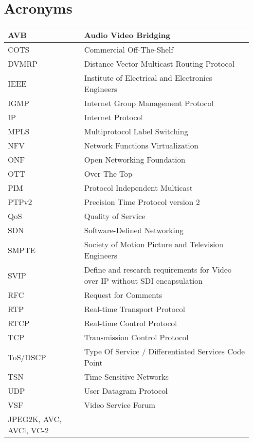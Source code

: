 \cleardoublepage
{}
\chapter*{Acronyms}

\begin{table*}[htb]
\centering
\begin{tabular}{p{} p{}}
\hline
AVB & Audio Video Bridging \\
\hline
COTS & Commercial Off-The-Shelf \\
\hline
DVMRP & Distance Vector Multicast Routing Protocol \\
\hline
IEEE & Institute of Electrical and Electronics Engineers \\
\hline
IGMP & Internet Group Management Protocol \\
\hline
IP & Internet Protocol \\
\hline
MPLS & Multiprotocol Label Switching \\
\hline
NFV & Network Functions Virtualization \\
\hline
ONF & Open Networking Foundation \\
\hline
OTT & Over The Top \\
\hline
PIM & Protocol Independent Multicast \\
\hline
PTPv2 & Precision Time Protocol version 2 \\
\hline
QoS & Quality of Service \\
\hline
SDN & Software-Defined Networking \\
\hline
SMPTE & Society of Motion Picture and Television Engineers \\
\hline
SVIP & Define and research requirements for Video over IP without SDI encapsulation \\
\hline
RFC & Request for Comments \\
\hline
RTP & Real-time Transport Protocol \\
\hline
RTCP & Real-time Control Protocol  \\
\hline
TCP & Transmission Control Protocol \\
\hline
ToS/DSCP & Type Of Service / Differentiated Services Code Point \\
\hline
TSN & Time Sensitive Networks \\
\hline
UDP & User Datagram Protocol \\
\hline
VSF & Video Service Forum \\
JPEG2K, AVC, AVCi, VC-2
\hline
\end{tabular}
\end{table*}


